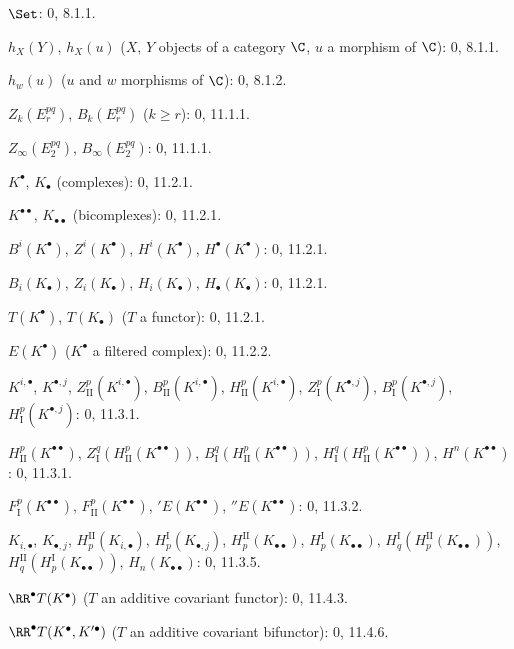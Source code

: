 \begin{flushleft}
$\Set$: 0, 8.1.1.

$h_X(Y)$, $h_X(u)$ ($X$, $Y$ objects of a category $\C$, $u$ a morphism
of $\C$): 0, 8.1.1.

$h_w(u)$ ($u$ and $w$ morphisms of $\C$): 0, 8.1.2.

$Z_k(E_r^{pq})$, $B_k(E_r^{pq})$ ($k\geq r$): 0, 11.1.1.

$Z_\infty(E_2^{pq})$, $B_\infty(E_2^{pq})$: 0, 11.1.1.

$K^\bullet$, $K_\bullet$ (complexes): 0, 11.2.1.

$K^{\bullet\bullet}$, $K_{\bullet\bullet}$ (bicomplexes): 0, 11.2.1.

$B^i(K^\bullet)$, $Z^i(K^\bullet)$, $H^i(K^\bullet)$,
$H^\bullet(K^\bullet)$: 0, 11.2.1.

$B_i(K_\bullet)$, $Z_i(K_\bullet)$, $H_i(K_\bullet)$,
$H_\bullet(K_\bullet)$: 0, 11.2.1.

$T(K^\bullet)$, $T(K_\bullet)$ ($T$ a functor): 0, 11.2.1.

$E(K^\bullet)$ ($K^\bullet$ a filtered complex): 0, 11.2.2.

$K^{i,\bullet}$, $K^{\bullet,j}$, $Z_{\mathrm{II}}^p(K^{i,\bullet})$,
$B_{\mathrm{II}}^p(K^{i,\bullet})$, $H_{\mathrm{II}}^p(K^{i,\bullet})$,
$Z_{\mathrm I}^p(K^{\bullet,j})$, $B_{\mathrm I}^p(K^{\bullet,j})$,
$H_{\mathrm I}^p(K^{\bullet,j})$: 0, 11.3.1.

$H_{\mathrm{II}}^p(K^{\bullet\bullet})$,
$Z_{\mathrm I}^q(H_{\mathrm{II}}^p(K^{\bullet\bullet}))$,
$B_{\mathrm I}^q(H_{\mathrm{II}}^p(K^{\bullet\bullet}))$,
$H_{\mathrm I}^q(H_{\mathrm{II}}^p(K^{\bullet\bullet}))$,
$H^n(K^{\bullet\bullet})$: 0, 11.3.1.

$F_{\mathrm I}^p(K^{\bullet\bullet})$,
$F_{\mathrm{II}}^p(K^{\bullet\bullet})$, ${}'E(K^{\bullet\bullet})$,
${}''E(K^{\bullet\bullet})$: 0, 11.3.2.

$K_{i,\bullet}$, $K_{\bullet,j}$, $H_p^{\mathrm{II}}(K_{i,\bullet})$,
$H_p^{\mathrm I}(K_{\bullet,j})$, $H_p^{\mathrm{II}}(K_{\bullet\bullet})$,
$H_p^{\mathrm I}(K_{\bullet\bullet})$,
$H_q^{\mathrm I}(H_p^{\mathrm{II}}(K_{\bullet\bullet}))$,
$H_q^{\mathrm{II}}(H_p^{\mathrm I}(K_{\bullet\bullet}))$,
$H_n(K_{\bullet\bullet})$: 0, 11.3.5.

$\RR^\bullet T(K^\bullet)$ ($T$ an additive covariant functor): 0, 11.4.3.

$\RR^\bullet T(K^\bullet,K'^{\bullet})$ ($T$ an additive covariant
bifunctor): 0, 11.4.6.


\end{flushleft}
